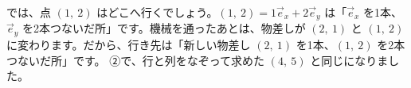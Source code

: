 では、点 $(1,\ 2)$ はどこへ行くでしょう。$(1,\ 2)=1\vec e_x+2\vec e_y$ は「$\vec e_x$ を1本、$\vec e_y$ を2本つないだ所」です。機械を通ったあとは、物差しが $(2,\ 1)$ と $(1,\ 2)$ に変わります。だから、行き先は「新しい物差し $(2,\ 1)$ を1本、$(1,\ 2)$ を2本つないだ所」です。
②で、行と列をなぞって求めた $(4,\ 5)$ と同じになりました。

